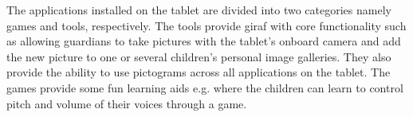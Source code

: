 The applications installed on the tablet are divided into two categories namely games and tools, respectively. The tools provide \ac{giraf} with core functionality such as allowing guardians to take pictures with the tablet's onboard camera and add the new picture to one or several children's personal image galleries. They also provide the ability to use pictograms across all applications on the tablet. The games provide some fun learning aids e.g. where the children can learn to control pitch and volume of their voices through a game. 